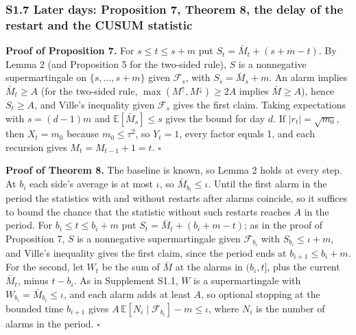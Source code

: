 \documentclass[
]{article}
\begin{document}
\hypertarget{s1.7-later-days-proposition-7-theorem-8-the-delay-of-the-restart-and-the-cusum-statistic}{%
\subsubsection{S1.7 Later days: Proposition 7, Theorem 8, the delay of
the restart and the CUSUM
statistic}\label{s1.7-later-days-proposition-7-theorem-8-the-delay-of-the-restart-and-the-cusum-statistic}}

\textbf{Proof of Proposition 7.} For \(s \le t \le s + m\) put
\(S_t = \bar M_t + (s + m - t)\). By Lemma 2 (and Proposition 5 for the
two-sided rule), \(S\) is a nonnegative supermartingale on
\(\lbrace s, \dots, s + m\rbrace\) given \(\mathcal{F}_s\), with
\(S_s = \bar M_s + m\). An alarm implies \(\bar M_t \ge A\) (for the
two-sided rule, \(\max(M^{\uparrow}, M^{\downarrow}) \ge 2A\) implies
\(\bar M \ge A\)), hence \(S_t \ge A\), and Ville's inequality given
\(\mathcal{F}_s\) gives the first claim. Taking expectations with
\(s = (d-1)m\) and \(\mathbb{E}[\bar M_s] \le s\) gives the bound for
day \(d\). If \(\lvert r_t\rvert = \sqrt{m_0}\), then \(X_t = m_0\)
because \(m_0 \le \tau^2\), so \(Y_t = 1\), every factor equals 1, and
each recursion gives \(M_t = M_{t-1} + 1 = t\). \(\square\)

\textbf{Proof of Theorem 8.} The baseline is known, so Lemma 2 holds at
every step. At \(b_i\) each side's average is at most \(\iota\), so
\(\bar M_{b_i} \le \iota\). Until the first alarm in the period the
statistics with and without restarts after alarms coincide, so it
suffices to bound the chance that the statistic without such restarts
reaches \(A\) in the period. For \(b_i \le t \le b_i + m\) put
\(S_t = \bar M_t + (b_i + m - t)\); as in the proof of Proposition 7,
\(S\) is a nonnegative supermartingale given \(\mathcal{F}_{b_i}\) with
\(S_{b_i} \le \iota + m\), and Ville's inequality gives the first claim,
since the period ends at \(b_{i+1} \le b_i + m\). For the second, let
\(W_t\) be the sum of \(\bar M\) at the alarms in \((b_i, t]\), plus the
current \(\bar M_t\), minus \(t - b_i\). As in Supplement S1.1, \(W\) is
a supermartingale with \(W_{b_i} = \bar M_{b_i} \le \iota\), and each
alarm adds at least \(A\), so optional stopping at the bounded time
\(b_{i+1}\) gives
\(A\,\mathbb{E}[N_i \mid \mathcal{F}_{b_i}] - m \le \iota\), where
\(N_i\) is the number of alarms in the period. \(\square\)
\end{document}
